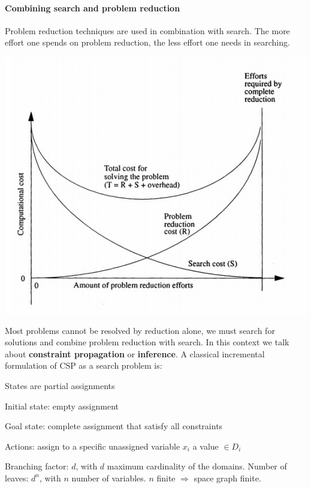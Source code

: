 \documentclass[10pt]{report}
\begin{document}
\paragraph{Combining search and problem reduction} Problem reduction techniques are used in combination with search. The more effort one spends on problem reduction, the less effort one needs in searching.
\begin{center}
	\includegraphics[scale=0.75]{7.png}
\end{center}
Most problems cannot be resolved by reduction alone, we must search for solutions and combine problem reduction with search. In this context we talk about \textbf{constraint propagation} or \textbf{inference}. A classical incremental formulation of CSP as a search problem is:
\begin{list}{}{}
	\item States are partial assignments
	\item Initial state: empty assignment
	\item Goal state: complete assignment that satisfy all constraints
	\item Actions: assign to a specific unassigned variable $x_i$ a value $\in D_i$
\end{list}
Branching factor: $d$, with $d$ maximum cardinality of the domains. Number of leaves: $d^n$, with $n$ number of variables. $n$ finite $\Rightarrow$ space graph finite.
\end{document}
